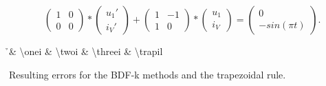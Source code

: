 \begin{frame}[noframenumbering]
	\vfill
	\begin{displaymath}
		\begin{pmatrix}
			1 & 0 \\
			0 & 0 
		\end{pmatrix}
		*
		\begin{pmatrix}
			u_1' \\
			i_V'
		\end{pmatrix}
		+
		\begin{pmatrix}
			1 & -1 \\
			1 & 0
		\end{pmatrix}
		*
		\begin{pmatrix}
			u_1 \\
			i_V
		\end{pmatrix}
		=
		\begin{pmatrix}
			0 \\
			-sin(\pi t)
		\end{pmatrix}.
	\end{displaymath}
		
	\begin{table}[H]
			\centering
			{\h & \num{\onei} & \num{\twoi} & \num{\threei} & \num{\trapil}}
		\caption{Resulting errors for the BDF-k methods and the trapezoidal rule.}
		\label{tab:error ex3}
	\end{table}
	\vfill
\end{frame}